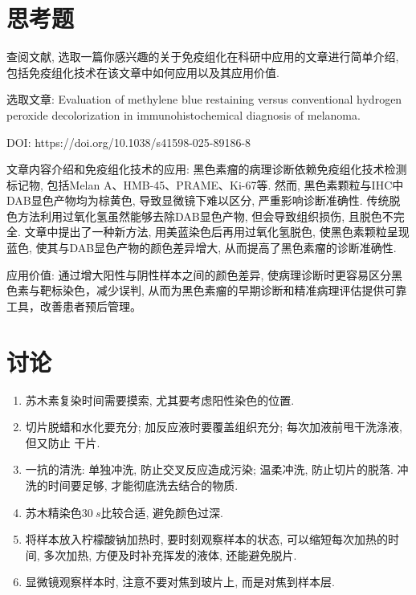 \documentclass{article}
\begin{document}
\section{思考题}

查阅文献, 选取一篇你感兴趣的关于免疫组化在科研中应用的文章进行简单介绍, 包括免疫组化技术在该文章中如何应用以及其应用价值.

\vspace{0.5cm}

选取文章: Evaluation of methylene blue restaining versus conventional hydrogen peroxide decolorization in immunohistochemical diagnosis of melanoma.

DOI: https://doi.org/10.1038/s41598-025-89186-8

\vspace{0.5cm}

文章内容介绍和免疫组化技术的应用: 黑色素瘤的病理诊断依赖免疫组化技术检测标记物, 包括Melan A、HMB-45、PRAME、Ki-67等. 然而, 黑色素颗粒与IHC中DAB显色产物均为棕黄色, 导致显微镜下难以区分, 严重影响诊断准确性. 传统脱色方法利用过氧化氢虽然能够去除DAB显色产物, 但会导致组织损伤, 且脱色不完全. 文章中提出了一种新方法, 用美蓝染色后再用过氧化氢脱色, 使黑色素颗粒呈现蓝色, 使其与DAB显色产物的颜色差异增大, 从而提高了黑色素瘤的诊断准确性.

\vspace{0.5cm}

应用价值: 通过增大阳性与阴性样本之间的颜色差异, 使病理诊断时更容易区分黑色素与靶标染色，减少误判, 从而为黑色素瘤的早期诊断和精准病理评估提供可靠工具，改善患者预后管理。

\section{讨论}

\begin{enumerate}
    \item 苏木素复染时间需要摸索, 尤其要考虑阳性染色的位置.
    \item 切片脱蜡和水化要充分; 加反应液时要覆盖组织充分; 每次加液前甩干洗涤液, 但又防止
    干片.
    \item 一抗的清洗: 单独冲洗, 防止交叉反应造成污染; 温柔冲洗, 防止切片的脱落. 冲洗的时间要足够, 才能彻底洗去结合的物质.
    \item 苏木精染色$30\ s$比较合适, 避免颜色过深.
    \item 将样本放入柠檬酸钠加热时, 要时刻观察样本的状态, 可以缩短每次加热的时间, 多次加热, 方便及时补充挥发的液体, 还能避免脱片.
    \item 显微镜观察样本时, 注意不要对焦到玻片上, 而是对焦到样本层.
\end{enumerate}
\end{document}
